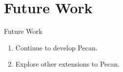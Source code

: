 \documentclass[leqno,presentation,usenames,dvipsnames]{beamer}
\begin{document}
\section{Future Work}
\begin{frame}{Future Work}
    \begin{enumerate}
        \item Continue to develop Pecan.
        \item Explore other extensions to Pecan.
    \end{enumerate}
\end{frame}
\end{document}

